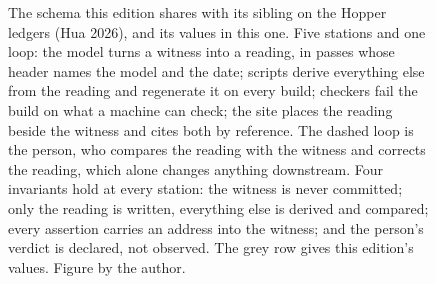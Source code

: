 \begin{figure}[htbp]
{}
\caption{The schema this edition shares with its sibling on the Hopper ledgers
(Hua 2026), and its values in this one. Five stations and one loop: the model turns a witness into a reading, in
passes whose header names the model and the date; scripts derive everything
else from the reading and regenerate it on every build; checkers fail the build
on what a machine can check; the site places the reading beside the witness
and cites both by reference. The dashed loop is the person, who compares the
reading with the witness and corrects the reading, which alone changes anything
downstream. Four invariants hold at every station: the witness is never committed;
only the reading is written, everything else is derived and compared; every
assertion carries an address into the witness; and the person's verdict is
declared, not observed. The grey row gives this edition's values. Figure by the
author.}\label{fig:pipeline}
\end{figure}
